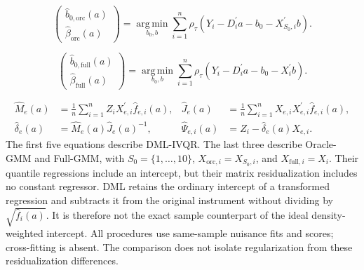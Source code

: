 \begin{equation}
    \begin{pmatrix}
        \widehat b_{0,\mathrm{orc}}(a)\\
        \widehat\beta_{\mathrm{orc}}(a)
    \end{pmatrix}
    =
    \operatorname*{arg\,min}_{b_0,b}
    \sum_{i=1}^{n}
    \rho_{\tau}\!\left(
        Y_i-D_i^{\prime}a-b_0-X_{S_0,i}^{\prime}b
    \right).
    \label{eq:oracle-beta}
\end{equation}

\begin{equation}
    \begin{pmatrix}
        \widehat b_{0,\mathrm{full}}(a)\\
        \widehat\beta_{\mathrm{full}}(a)
    \end{pmatrix}
    =
    \operatorname*{arg\,min}_{b_0,b}
    \sum_{i=1}^{n}
    \rho_{\tau}\!\left(
        Y_i-D_i^{\prime}a-b_0-X_i^{\prime}b
    \right).
    \label{eq:full-beta}
\end{equation}

\begin{equation}
    \begin{aligned}
        \widehat M_e(a)
        &=\frac{1}{n}\sum_{i=1}^{n}
          Z_iX_{e,i}^{\prime}\widehat f_{e,i}(a),&
        \widehat J_e(a)
        &=\frac{1}{n}\sum_{i=1}^{n}
          X_{e,i}X_{e,i}^{\prime}\widehat f_{e,i}(a),\\
        \widehat\delta_e(a)
        &=\widehat M_e(a)\widehat J_e(a)^{-1},&
        \widehat\Psi_{e,i}(a)
        &=Z_i-\widehat\delta_e(a)X_{e,i}.
    \end{aligned}
    \label{eq:benchmark-residualization}
\end{equation}
The first five equations describe DML-IVQR. The last three describe Oracle-GMM and Full-GMM, with $S_0=\{1,\ldots,10\}$, $X_{\mathrm{orc},i}=X_{S_0,i}$, and $X_{\mathrm{full},i}=X_i$. Their quantile regressions include an intercept, but their matrix residualization includes no constant regressor. DML retains the ordinary intercept of a transformed regression and subtracts it from the original instrument without dividing by $\sqrt{\widehat f_i(a)}$. It is therefore not the exact sample counterpart of the ideal density-weighted intercept. All procedures use same-sample nuisance fits and scores; cross-fitting is absent. The comparison does not isolate regularization from these residualization differences.

